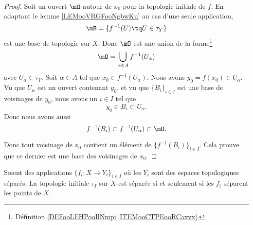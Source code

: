 \begin{proof}
	Soit un ouvert \( \mO\) autour de \( x_0\) pour la topologie initiale de \( f\). En adaptant le lemme \ref{LEMooVRGFooNgbwKu} au cas d'une seule application,
	\begin{equation}
		\mB=\{ f^{-1}(U)\tq U\in \tau_Y \}
	\end{equation}
	est une base de topologie sur \( X\). Donc \( \mO\) est une union de la forme\footnote{Définition \ref{DEFooLEHPooIlNmpi}\ref{ITEMooCTPEooRCaxvx}.}
	\begin{equation}
		\mO=\bigcup_{\alpha\in A}f^{-1}(U_{\alpha})
	\end{equation}
	avec \( U_{\alpha}\in \tau_Y\). Soit \( \alpha\in A\) tel que \( x_0\in f^{-1}(U_{\alpha})\). Nous avons \( y_0=f(x_0)\in U_{\alpha}\). Vu que \( U_{\alpha}\) est un ouvert contenant \( y_0\), et vu que \( \{ B_i \}_{i\in I}\) est une base de voisinages de \( y_0\), nous avons un \( i\in I\) tel que
	\begin{equation}
		y_0\in B_i\subset U_{\alpha}.
	\end{equation}
	Donc nous avons aussi
	\begin{equation}
		f^{-1}(B_i)\subset f^{-1}(U_{\alpha})\subset \mO.
	\end{equation}

	Donc tout voisinage de \( x_0\) contient un élément de \( \{ f^{-1}(B_i) \}_{i\in I}\). Cela prouve que ce dernier est une base des voisinages de \( x_0\).
\end{proof}

\begin{proposition}	\label{PROPooSEQRooZoQPbZ}
	Soient des applications \( \{f_i \colon X\to Y_i   \}_{i\in I} \) où les \( Y_i\) sont des espaces topologiques séparés. La topologie initiale \( \tau_I\) sur \( X\) est séparée si et seulement si les \( f_i\) séparent les points de \( X\).
\end{proposition}

